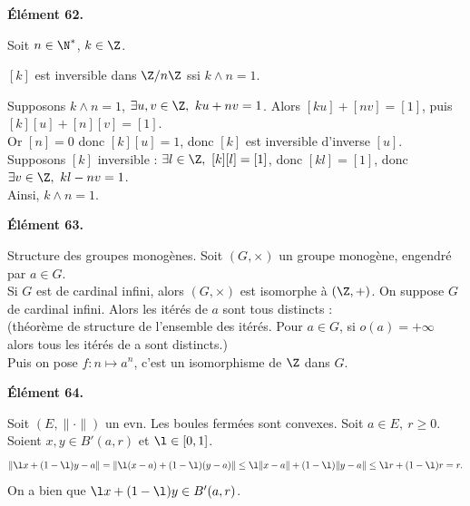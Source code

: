 \documentclass[11pt]{article}
\begin{document}
\pagebreak

\begin{center}
    \bf{Élément 62.}
\end{center}

\begin{thm}{ }{}
    Soit $n\in\N^*$, $k\in\Z$.
    \begin{center}
        $[k]$ est inversible dans $\Z/n\Z$ ssi $k\land n = 1$.
    \end{center}
    \tcblower
    \boxed{\ra} Supposons $k\land n = 1$, $\exists u,v \in \Z, ~ ku+nv=1$. Alors $[ku]+[nv]=[1]$, puis $[k][u]+[n][v]=[1]$.\\
    Or $[n]=0$ donc $[k][u]=1$, donc $[k]$ est inversible d'inverse $[u]$.\\
    \boxed{\la} Supposons $[k]$ inversible : $\exists l \in \Z, ~ [k][l]=[1]$, donc $[kl]=[1]$, donc $\exists v \in \Z, ~ kl-nv=1$.\\
    Ainsi, $k\land n = 1$.
\end{thm}

\vspace*{-0.4cm}

\begin{center}
    \bf{Élément 63.}
\end{center}

\begin{thm}{Structure des groupes monogènes.  }{}
    Soit $(G,\times)$ un groupe monogène, engendré par $a\in G$.\\
    Si $G$ est de cardinal infini, alors $(G,\times)$ est isomorphe à $(\Z,+)$.
    \tcblower
     On suppose $G$ de cardinal infini. Alors les itérés de $a$ sont tous distincts : \\
    (théorème de structure de l'ensemble des itérés. Pour $a \in G$, si $o(a) = +\infty$ alors tous les itérés de a sont distincts.)\\
    Puis on pose $f:n\mapsto a^n$, c'est un isomorphisme de $\Z$ dans $G$.
\end{thm}

\vspace*{-0.4cm}

\begin{center}
    \bf{Élément 64.}
\end{center}

\begin{prop}{ }{}
    Soit $(E,\|\cdot\|)$ un evn. Les boules fermées sont convexes.
    \tcblower
    Soit $a\in E, ~ r\geq 0$. Soient $x,y\in B'(a,r)$ et $\l\in[0,1]$.
    \begin{equation*}
        \| \l x + (1 - \l)y - a \| = \| \l(x-a) + (1-\l)(y-a) \| \leq \l\|x-a\| + (1-\l)\|y-a\| \leq \l r + (1-\l)r = r.
    \end{equation*}
    On a bien que $\l x + (1-\l)y \in B'(a,r)$.
\end{prop}
\end{document}
